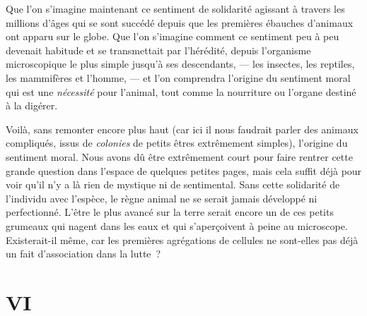 \documentclass[french,twoside]{book} %
\begin{document}
\bigbreak
\noindent Que l’on s’imagine maintenant ce sentiment de solidarité agissant à travers les millions d’âges qui se sont succédé depuis que les premières ébauches d’animaux ont apparu sur le globe. Que l’on s’imagine comment ce sentiment peu à peu devenait habitude et se transmettait par l’hérédité, depuis l’organisme microscopique le plus simple jusqu’à ses descendants, — les insectes, les reptiles, les mammifères et l’homme, — et l’on comprendra l’origine du sentiment moral qui est une \emph{nécessité} pour l’animal, tout comme la nourriture ou l’organe destiné à la digérer.\par
Voilà, sans remonter encore plus haut (car ici il nous faudrait parler des animaux compliqués, issus de \emph{colonies} de petits êtres extrêmement simples), l’origine du sentiment moral. Nous avons dû être extrêmement court pour faire rentrer cette grande question dans l’espace de quelques petites pages, mais cela suffit déjà pour voir qu’il n’y a là rien de mystique ni de sentimental. Sans cette solidarité de l’individu avec l’espèce, le règne animal ne se serait jamais développé ni perfectionné. L’être le plus avancé sur la terre serait encore un de ces petits grumeaux qui nagent dans les eaux et qui s’aperçoivent à peine au microscope. Existerait-il même, car les premières agrégations de cellules ne sont-elles pas déjà un fait d’association dans la lutte ?
\section[{VI}]{VI}
\label{p06}\renewcommand{\leftmark}{VI}
\end{document}
